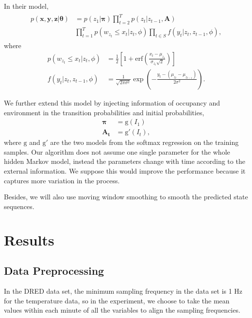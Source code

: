 \documentclass[sigconf]{acmart}
\begin{document}
In their model,
\begin{align}
  \begin{split}
  p(\mathbf{x}, \mathbf{y}, \mathbf{z}|\mathbf{\theta}) &=
                                                          p(z_{1}|\mathbf{\pi})\prod_{t=2}^{T}p(z_{t}|z_{t-1},\mathbf{A})\\
                                                        &\prod_{t=1}^{T}p(w_{z_{t}} \leq x_{t}|z_{t}, \phi)\prod_{t\in
                                                          S}f(y_{t}|z_{t}, z_{t-1}, \phi),
  \end{split}
\end{align}
where
\begin{align}
p(w_{z_{t}} \leq x_{t} | z_{t}, \phi) &= \frac{1}{2}\left[ 1 +
  \mathrm{erf}\left( \frac{x_{t} -
  \mu_{z_{t}}}{\sigma_{z_{t}}\sqrt{2}} \right) \right] \\
f(y_{t} | z_{t}, z_{t-1}, \phi) &=
  \frac{1}{\sqrt{2\pi\sigma^{2}}}\exp\left( -\frac{y_{t} - (\mu_{z_{t}}
  - \mu_{z_{t-1}})}{2\sigma^{2}} \right).
\end{align}

We further extend this model by injecting information of occupancy and
environment in the transition probabilities and initial probabilities,
\begin{align}
  \mathbf{\pi} &= \mathrm{g}(I_{1}) \\
  \mathbf{A_{t}} &= \mathrm{g'}(I_{t}),
\end{align}
where $\mathrm{g}$ and $\mathrm{g'}$ are the two models from the
softmax regression on the training samples. Our algorithm does not
assume one single parameter for the whole hidden Markov model, instead
the parameters change with time according to the external information.
We suppose this would improve the performance because it captures more
variation in the process.

Besides, we will also use moving window smoothing to smooth the
predicted state sequences.

\section{Results}

\subsection{Data Preprocessing}

In the DRED data set, the minimum sampling frequency in the data set
is 1 Hz for the temperature data, so in the experiment, we choose to
take the mean values within each minute of all the variables to align
the sampling frequencies.
\end{document}
